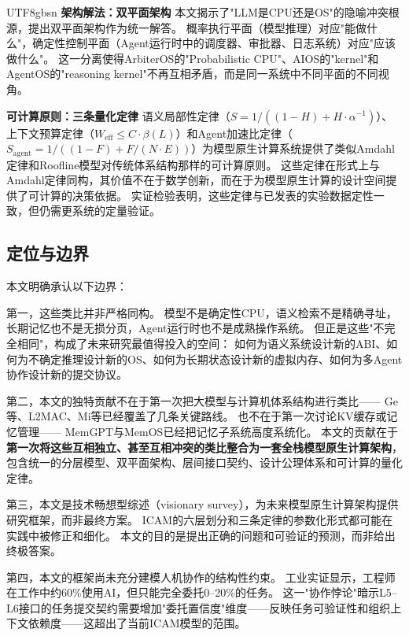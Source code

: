 \documentclass[11pt,a4paper]{article}
\begin{document}
\begin{CJK*}{UTF8}{gbsn}
\textbf{架构解法：双平面架构}
本文揭示了"LLM是CPU还是OS"的隐喻冲突根源，提出双平面架构作为统一解答。
概率执行平面（模型推理）对应"能做什么"，确定性控制平面（Agent运行时中的调度器、审批器、日志系统）对应"应该做什么"。
这一分离使得ArbiterOS的"Probabilistic CPU"\cite{arbiteros2025}、AIOS的"kernel"\cite{mei2024aios}和AgentOS的"reasoning kernel"\cite{agentos2025}不再互相矛盾，而是同一系统中不同平面的不同视角。

\textbf{可计算原则：三条量化定律}
语义局部性定律（$S = 1/((1-H)+H\cdot\alpha^{-1})$）、上下文预算定律（$W_{\mathrm{eff}} \leq C \cdot \beta(L)$）和Agent加速比定律（$S_{\mathrm{agent}} = 1/((1-F)+F/(N\cdot E))$）为模型原生计算系统提供了类似Amdahl定律和Roofline模型对传统体系结构那样的可计算原则。
这些定律在形式上与Amdahl定律同构，其价值不在于数学创新，而在于为模型原生计算的设计空间提供了可计算的决策依据。
实证检验表明，这些定律与已发表的实验数据定性一致，但仍需更系统的定量验证。

\subsection{定位与边界}

本文明确承认以下边界：

第一，这些类比并非严格同构。
模型不是确定性CPU，语义检索不是精确寻址，长期记忆也不是无损分页，Agent运行时也不是成熟操作系统。
但正是这些"不完全相同"，构成了未来研究最值得投入的空间：
如何为语义系统设计新的ABI、如何为不确定推理设计新的OS、如何为长期状态设计新的虚拟内存、如何为多Agent协作设计新的提交协议。

第二，本文的独特贡献不在于第一次把大模型与计算机体系结构进行类比——
Ge等\cite{ge2023llmos}、L2MAC\cite{holt2024l2mac}、Mi等\cite{mi2025llmagentscomputersystems}已经覆盖了几条关键路线。
也不在于第一次讨论KV缓存或记忆管理——
MemGPT\cite{memgpt2023}与MemOS\cite{memos2025}已经把记忆子系统高度系统化。
本文的贡献在于\textbf{第一次将这些互相独立、甚至互相冲突的类比整合为一套全栈模型原生计算架构}，包含统一的分层模型、双平面架构、层间接口契约、设计公理体系和可计算的量化定律。

第三，本文是技术畅想型综述（visionary survey），为未来模型原生计算架构提供研究框架，而非最终方案。
ICAM的六层划分和三条定律的参数化形式都可能在实践中被修正和细化。
本文的目的是提出正确的问题和可验证的预测，而非给出终极答案。

第四，本文的框架尚未充分建模人机协作的结构性约束。
工业实证显示，工程师在工作中约60\%使用AI，但只能完全委托0--20\%的任务\cite{anthropic2026agenticreport}。
这一"协作悖论"暗示L5--L6接口的任务提交契约需要增加"委托置信度"维度——反映任务可验证性和组织上下文依赖度——这超出了当前ICAM模型的范围。


\end{CJK*}
\end{document}
